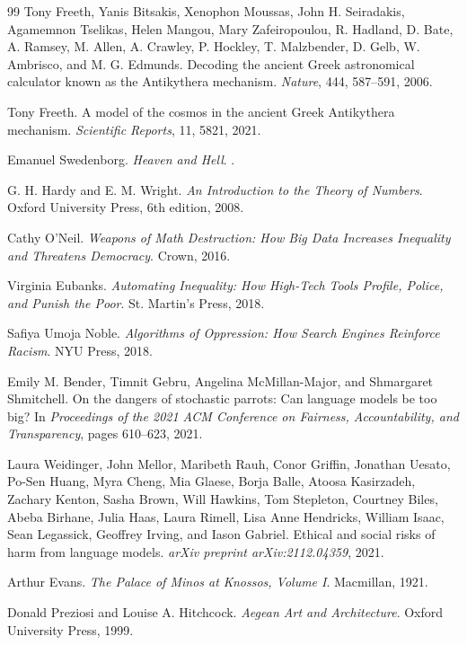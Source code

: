 \documentclass[11pt]{book}
\begin{document}
\begin{thebibliography}{99}
Tony Freeth, Yanis Bitsakis, Xenophon Moussas, John H. Seiradakis, Agamemnon Tselikas, Helen Mangou, Mary Zafeiropoulou, R. Hadland, D. Bate, A. Ramsey, M. Allen, A. Crawley, P. Hockley, T. Malzbender, D. Gelb, W. Ambrisco, and M. G. Edmunds.
\newblock Decoding the ancient Greek astronomical calculator known as the Antikythera mechanism.
\newblock \emph{Nature}, 444, 587--591, 2006.

Tony Freeth.
\newblock A model of the cosmos in the ancient Greek Antikythera mechanism.
\newblock \emph{Scientific Reports}, 11, 5821, 2021.

Emanuel Swedenborg.
\newblock \emph{Heaven and Hell}.
.

G. H. Hardy and E. M. Wright.
\newblock \emph{An Introduction to the Theory of Numbers}.
\newblock Oxford University Press, 6th edition, 2008.

Cathy O'Neil.
\newblock \emph{Weapons of Math Destruction: How Big Data Increases Inequality and Threatens Democracy}.
\newblock Crown, 2016.

Virginia Eubanks.
\newblock \emph{Automating Inequality: How High-Tech Tools Profile, Police, and Punish the Poor}.
\newblock St. Martin's Press, 2018.

Safiya Umoja Noble.
\newblock \emph{Algorithms of Oppression: How Search Engines Reinforce Racism}.
\newblock NYU Press, 2018.

Emily M. Bender, Timnit Gebru, Angelina McMillan-Major, and Shmargaret Shmitchell.
\newblock On the dangers of stochastic parrots: Can language models be too big?
\newblock In \emph{Proceedings of the 2021 ACM Conference on Fairness, Accountability, and Transparency}, pages 610--623, 2021.

Laura Weidinger, John Mellor, Maribeth Rauh, Conor Griffin, Jonathan Uesato, Po-Sen Huang, Myra Cheng, Mia Glaese, Borja Balle, Atoosa Kasirzadeh, Zachary Kenton, Sasha Brown, Will Hawkins, Tom Stepleton, Courtney Biles, Abeba Birhane, Julia Haas, Laura Rimell, Lisa Anne Hendricks, William Isaac, Sean Legassick, Geoffrey Irving, and Iason Gabriel.
\newblock Ethical and social risks of harm from language models.
\newblock \emph{arXiv preprint arXiv:2112.04359}, 2021.

Arthur Evans.
\newblock \emph{The Palace of Minos at Knossos, Volume I}.
\newblock Macmillan, 1921.

Donald Preziosi and Louise A. Hitchcock.
\newblock \emph{Aegean Art and Architecture}.
\newblock Oxford University Press, 1999.

\end{thebibliography}
\end{document}
